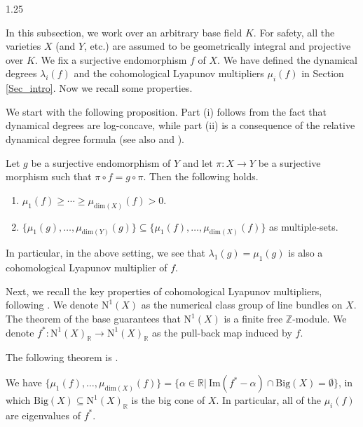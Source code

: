 \documentclass[12pt]{amsart}
\begin{document}
\begin{spacing}{1.25}
\ 

In this subsection, we work over an arbitrary base field $K$. For safety, all the varieties $X$ (and $Y$, etc.) are assumed to be geometrically integral and projective over $K$. We fix a surjective endomorphism $f$ of $X$. We have defined the dynamical degrees $\lambda_i(f)$ and the cohomological Lyapunov multipliers $\mu_i(f)$ in Section \ref{Sec_intro}. Now we recall some properties.

We start with the following proposition. Part (i) follows from the fact that dynamical degrees are log-concave, while part (ii) is a consequence of the relative dynamical degree formula \cite[Theorem 1.1]{DN11} (see also \cite[Theorem 4]{Dang} and \cite[Theorem 1.3]{Tru20}).

\begin{proposition}\label{Prop_Lya}
Let $g$ be a surjective endomorphism of $Y$ and let $\pi:X\rightarrow Y$ be a surjective morphism such that $\pi\circ f=g\circ\pi$. Then the following holds.
\begin{enumerate}
\item
$\mu_1(f)\geq\cdots\geq\mu_{\mathrm{dim}(X)}(f)>0$.
\item
$\{\mu_1(g),\dots,\mu_{\mathrm{dim}(Y)}(g)\}\subseteq\{\mu_1(f),\dots,\mu_{\mathrm{dim}(X)}(f)\}$ as multiple-sets.
\end{enumerate}
\end{proposition}

In particular, in the above setting, we see that $\lambda_1(g)=\mu_1(g)$ is also a cohomological Lyapunov multiplier of $f$.

Next, we recall the key properties of cohomological Lyapunov multipliers, following \cite{xie25}. We denote $\mathrm{N}^1(X)$ as the numerical class group of line bundles on $X$. The theorem of the base guarantees that $\mathrm{N}^1(X)$ is a finite free $\mathbb{Z}$-module. We denote $f^*:\text{N}^1(X)_{\mathbb{R}}\rightarrow\text{N}^1(X)_{\mathbb{R}}$ as the pull-back map induced by $f$.

The following theorem is \cite[Theorem 1.4]{xie25}.

\begin{theorem}\label{Thm_Xie1.4}
We have $\{\mu_1(f),\dots,\mu_{\mathrm{dim}(X)}(f)\}=\{\alpha\in\mathbb{R}|\ \mathrm{Im}(f^*-\alpha)\cap\mathrm{Big}(X)=\emptyset\}$, in which $\mathrm{Big}(X)\subseteq\mathrm{N}^1(X)_{\mathbb{R}}$ is the big cone of $X$. In particular, all of the $\mu_i(f)$ are eigenvalues of $f^*$.
\end{theorem}


\end{spacing}
\end{document}
